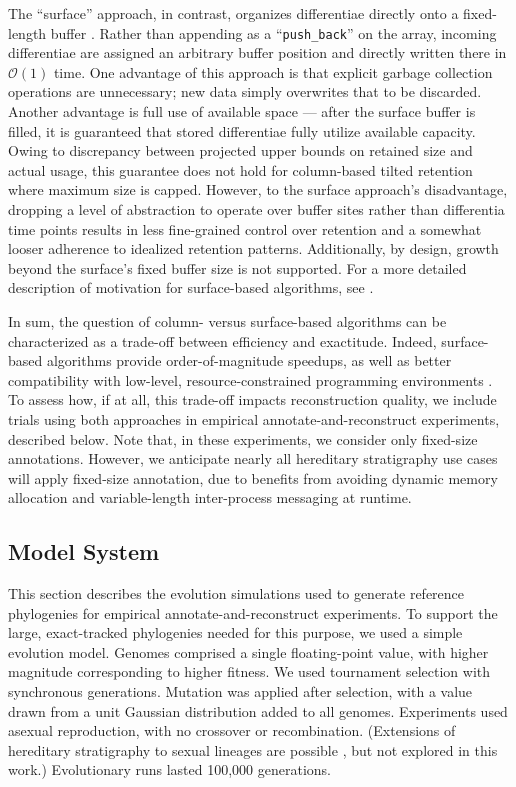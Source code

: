The ``surface'' approach, in contrast, organizes differentiae directly onto a fixed-length buffer \citep{moreno2024structured}.
Rather than appending as a ``\texttt{push\_back}'' on the array, incoming differentiae are assigned an arbitrary buffer position and directly written there in $\mathcal{O}(1)$ time.
One advantage of this approach is that explicit garbage collection operations are unnecessary; new data simply overwrites that to be discarded.
Another advantage is full use of available space --- after the surface buffer is filled, it is guaranteed that stored differentiae fully utilize available capacity.
Owing to discrepancy between projected upper bounds on retained size and actual usage, this guarantee does not hold for column-based tilted retention where maximum size is capped.
However, to the surface approach's disadvantage, dropping a level of abstraction to operate over buffer sites rather than differentia time points results in less fine-grained control over retention and a somewhat looser adherence to idealized retention patterns.
Additionally, by design, growth beyond the surface's fixed buffer size is not supported.
For a more detailed description of motivation for surface-based algorithms, see \citep{moreno2024trackable}.

In sum, the question of column- versus surface-based algorithms can be characterized as a trade-off between efficiency and exactitude.
Indeed, surface-based algorithms provide order-of-magnitude speedups, as well as better compatibility with low-level, resource-constrained programming environments \citep{moreno2024trackable}.
To assess how, if at all, this trade-off impacts reconstruction quality, we include trials using both approaches in empirical annotate-and-reconstruct experiments, described below.
Note that, in these experiments, we consider only fixed-size annotations.
However, we anticipate nearly all hereditary stratigraphy use cases will apply fixed-size annotation, due to benefits from avoiding dynamic memory allocation and variable-length inter-process messaging at runtime.

\subsection{Model System}

This section describes the evolution simulations used to generate reference phylogenies for empirical annotate-and-reconstruct experiments.
To support the large, exact-tracked phylogenies needed for this purpose, we used a simple evolution model.
Genomes comprised a single floating-point value, with higher magnitude corresponding to higher fitness.
We used tournament selection with synchronous generations.
Mutation was applied after selection, with a value drawn from a unit Gaussian distribution added to all genomes.
Experiments used asexual reproduction, with no crossover or recombination.
(Extensions of hereditary stratigraphy to sexual lineages are possible \citep{moreno2024methods}, but not explored in this work.)
Evolutionary runs lasted 100,000 generations.

